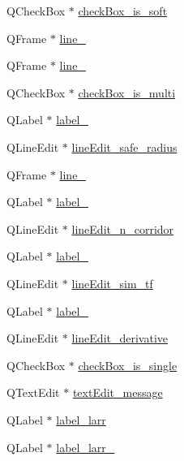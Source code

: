 \begin{DoxyCompactItemize}
Q\+Check\+Box $\ast$ \hyperlink{class_ui___main_window_aba7882352e93b6723bfdc1fcfae07cb3}{check\+Box\+\_\+is\+\_\+soft}
\item 
Q\+Frame $\ast$ \hyperlink{class_ui___main_window_a3ef6876a5881954fc438e25a56f2b0d4}{line\+\_}
\item 
Q\+Frame $\ast$ \hyperlink{class_ui___main_window_a2cdc8e583c152028a110fd6d79ba1298}{line\+\_}
\item 
Q\+Check\+Box $\ast$ \hyperlink{class_ui___main_window_ae2abbaae1ca7973cea2517946b0d9c18}{check\+Box\+\_\+is\+\_\+multi}
\item 
Q\+Label $\ast$ \hyperlink{class_ui___main_window_ac10ed68694c23da02ddc0ceacd54ef01}{label\+\_}
\item 
Q\+Line\+Edit $\ast$ \hyperlink{class_ui___main_window_a381929a8b1f17dedb69a1569d678ca2f}{line\+Edit\+\_\+safe\+\_\+radius}
\item 
Q\+Frame $\ast$ \hyperlink{class_ui___main_window_ad1616ec841f70368e1cddb42ba7653d5}{line\+\_}
\item 
Q\+Label $\ast$ \hyperlink{class_ui___main_window_a9687c8357009cfcf28517fa276ea1918}{label\+\_}
\item 
Q\+Line\+Edit $\ast$ \hyperlink{class_ui___main_window_a87f1c3679fff12e451234f3f6cf1a620}{line\+Edit\+\_\+n\+\_\+corridor}
\item 
Q\+Label $\ast$ \hyperlink{class_ui___main_window_abbe5a2168615ca342d06286db75927bc}{label\+\_}
\item 
Q\+Line\+Edit $\ast$ \hyperlink{class_ui___main_window_a433a1cdefc31a548bb5a3c9b34489d67}{line\+Edit\+\_\+sim\+\_\+tf}
\item 
Q\+Label $\ast$ \hyperlink{class_ui___main_window_a0130582ecf8dfbf621aa87f6d0d702f7}{label\+\_}
\item 
Q\+Line\+Edit $\ast$ \hyperlink{class_ui___main_window_aae0efe7958264dbcc58f8c308d1bf49c}{line\+Edit\+\_\+derivative}
\item 
Q\+Check\+Box $\ast$ \hyperlink{class_ui___main_window_abe81712792b45ca304d2d64d47733240}{check\+Box\+\_\+is\+\_\+single}
\item 
Q\+Text\+Edit $\ast$ \hyperlink{class_ui___main_window_ae1dd77d4b2a80359c1f593a940b26418}{text\+Edit\+\_\+message}
\item 
Q\+Label $\ast$ \hyperlink{class_ui___main_window_aa107ef3f0a591af5ab5a53feeaf98cf5}{label\+\_\+larr}
\item 
Q\+Label $\ast$ \hyperlink{class_ui___main_window_a9952714064881810c364b0c31d2d59df}{label\+\_\+larr\+\_}

\end{DoxyCompactItemize}
